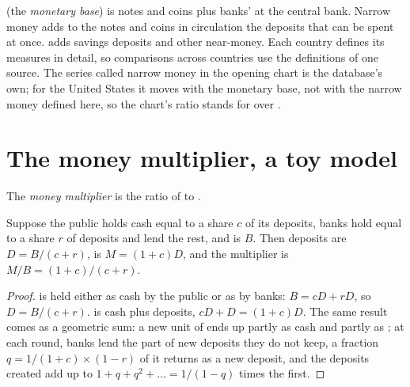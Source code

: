 \begin{measure}
 (the \emph{monetary base}) is notes and coins plus banks'  at the central bank. Narrow money adds to the notes and coins in circulation the
deposits that can be spent at once.  adds savings deposits and other near-money. Each country defines its measures in detail, so comparisons across countries
use the definitions of one source. The series called narrow money in the opening chart is the database's own; for the United States it moves
with the monetary base, not with the narrow money defined here, so the chart's ratio stands for  over .
\end{measure}

\section{The money multiplier, a toy model}\label{sec:g11:money-and-banking:multiplier}

\begin{definition}\label{def:g11:money-and-banking:money-multiplier}
The \emph{money multiplier} is the ratio of  to .
\end{definition}

\begin{proposition}\label{prop:g11:money-and-banking:multiplier}
Suppose the public holds cash equal to a share $c$ of its deposits, banks hold  equal to a share $r$ of deposits and lend the rest, and  is $B$.
Then deposits are $D = B/(c + r)$,  is $M = (1 + c)D$, and the multiplier is $M/B = (1 + c)/(c + r)$.
\end{proposition}
\begin{proof}
 is held either as cash by the public or as  by banks: $B = cD + rD$, so $D = B/(c + r)$.  is cash plus deposits, $cD + D = (1 + c)D$.
The same result comes as a geometric sum: a new unit of  ends up partly as cash and partly as ; at each round, banks lend the part of new deposits
they do not keep, a fraction $q = 1/(1 + c) \times (1 - r)$ of it returns as a new deposit, and the deposits created add up to $1 + q + q^2 + \dots = 1/(1 - q)$ times the
first.
\end{proof}

